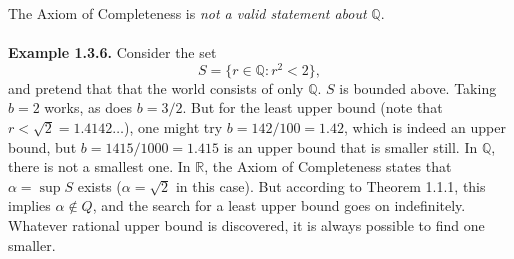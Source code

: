 \documentclass{article}
\begin{document}
        The Axiom of Completeness is \textit{not a valid statement about} $\mathbb{Q}$.\\ \\
        \textbf{Example 1.3.6.} Consider the set
        \begin{equation*}
            S = \{r \in \mathbb{Q} : r^2 < 2\},
        \end{equation*}
        and pretend that that the world consists of only $\mathbb{Q}$. $S$ is bounded above. Taking $b = 2$ works, as does $b = 3/2$. But for the least upper bound (note that $r < \sqrt{2}=1.4142\dots$), one might try $b=142/100 = 1.42$, which is indeed an upper bound, but $b=1415/1000 = 1.415$ is an upper bound that is smaller still. In $\mathbb{Q}$, there is not a smallest one. In $\mathbb{R}$, the Axiom of Completeness states that $\alpha = \sup S$ exists ($\alpha = \sqrt{2}$ in this case). But according to Theorem 1.1.1, this implies $\alpha \notin Q$, and the search for a least upper bound goes on indefinitely. Whatever rational upper bound is discovered, it is always possible to find one smaller.\\
        
\end{document}
